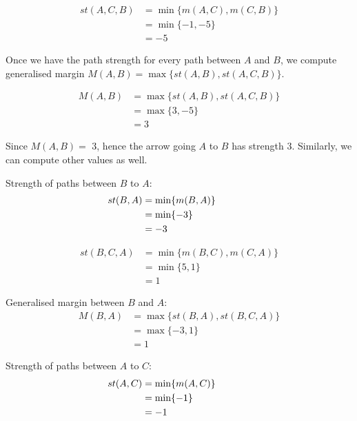 \begin{align}
st (A, C, B)&=  \min \lbrace m (A, C), m (C, B) \rbrace  \nonumber \\
                     &= \min \lbrace -1, -5 \rbrace \nonumber \\
                     &= -5\nonumber
\end{align}

Once we have the path strength for every path between $A$ and $B$, we compute generalised margin 
$M(A, B) = \max \lbrace st (A, B), st(A, C, B) \rbrace$.


\begin{align}
M (A, B)&=  \max \lbrace st (A, B), st(A, C, B) \rbrace \nonumber \\
                     &= \max \lbrace 3, -5 \rbrace \nonumber \\
                     &= 3\nonumber
\end{align}


Since $M(A, B) = $ 3,  hence the arrow going $A$ to $B$ has strength 3.   Similarly, we can compute other values as well. 

\noident
Strength of paths between $B$ to $A$:
\begin{align}
\hspace{-3cm} st (B, A)&=  \min \lbrace m (B, A) \rbrace  \nonumber \\
					  &= \min \lbrace -3 \rbrace  \nonumber \\
                     &= -3 \nonumber
\end{align}


\begin{align}
st (B, C, A)&=  \min \lbrace m (B, C), m (C, A) \rbrace  \nonumber \\
                     &= \min \lbrace 5, 1 \rbrace \nonumber \\
                     &= 1\nonumber
\end{align}

\noindent
Generalised margin between $B$ and $A$:
\begin{align}
M (B, A)&=  \max \lbrace st (B, A), st(B, C, A) \rbrace \nonumber \\
                     &= \max \lbrace -3, 1 \rbrace \nonumber \\
                     &= 1\nonumber
\end{align}

\noident
Strength of paths between $A$ to $C$:
\begin{align}
\hspace{-3cm} st (A, C)&=  \min \lbrace m (A, C) \rbrace  \nonumber \\
					  &= \min \lbrace -1 \rbrace  \nonumber \\
                     &= -1 \nonumber
\end{align}


